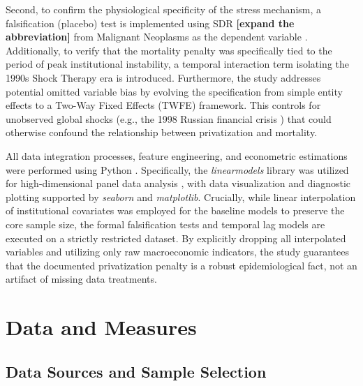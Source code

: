 \documentclass[12pt]{article}
\begin{document}
Second, to confirm the physiological specificity of the stress mechanism, a falsification (placebo) test is implemented using SDR \textbf{[expand the abbreviation]} from Malignant Neoplasms as the dependent variable \citep{Leon1997, Brainerd2005}. 
Additionally, to verify that the mortality penalty was specifically tied to the period of peak institutional instability, a temporal interaction term isolating the 1990s Shock Therapy era is introduced.
Furthermore, the study addresses potential omitted variable bias by evolving the specification from simple entity effects to a Two-Way Fixed Effects (TWFE) framework. This controls for unobserved global shocks 
(e.g., the 1998 Russian financial crisis \citep{EBRD1999}) that could otherwise confound the relationship between privatization and mortality. 

All data integration processes, feature engineering, and econometric estimations were performed using Python \citep{Python3}. Specifically, the \textit{linearmodels} library was utilized for high-dimensional 
panel data analysis \citep{Sheppard2021}, with data visualization and diagnostic plotting supported by \textit{seaborn} and \textit{matplotlib}. Crucially, while linear interpolation of institutional covariates 
was employed for the baseline models to preserve the core sample size, the formal falsification tests and temporal lag models are executed on a strictly restricted dataset. By explicitly dropping all interpolated 
variables and utilizing only raw macroeconomic indicators, the study guarantees that the documented privatization penalty is a robust epidemiological fact, not an artifact of missing data treatments.


\section{Data and Measures}

\subsection{Data Sources and Sample Selection}
\end{document}
